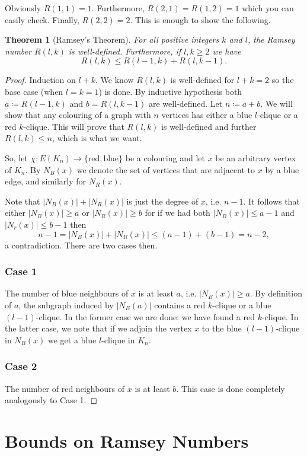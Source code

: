 \documentclass{report}
\theoremstyle{definition}
\theoremstyle{plain}
\newtheorem{thm}{Theorem}
\theoremstyle{definition}
\begin{document}
	Obviously $R(1,1) = 1$. Furthermore, $R(2,1) = R(1,2) = 1$ which you can easily check. Finally, $R(2,2)= 2$. This is enough to show the following.
	\begin{thm}[Ramsey's Theorem]\label{thm:ramsey}
		For all positive integers $k$ and $l$, the Ramsey number $R(l,k)$ is well-defined. Furthermore, if $l,k\geq 2$ we have
		\[
			R(l,k) \leq R(l-1,k) + R(l,k-1).
		\] 
	\end{thm} 
	\begin{proof}
		Induction on $l+k$. We know $R(l,k)$ is well-defined for $l+k = 2$ so the base case (when $l=k=1$) is done. By inductive hypothesis both $a\coloneqq R(l-1, k)$ and $b = R(l,k-1)$ are well-defined. Let $n\coloneqq a+b$. We will show that any colouring of a graph with $n$ vertices has either a blue $l$-clique or a red $k$-clique. This will prove that $R(l,k)$ is well-defined and further $R(l,k) \leq n$, which is what we want.
		
		So, let $\chi \colon E(K_n) \to \{\text{red},\text{blue}\}$ be a colouring and let $x$ be an arbitrary vertex of $K_n$. By $N_B(x)$ we denote the set of vertices that are adjacent to $x$ by a blue edge, and similarly for $N_R(x)$.
		
		Note that $|N_B(x)| + |N_R(x)|$ is just the degree of $x$, i.e. $n-1$. It follows that either $|N_B(x)| \geq a$ or $|N_R(x)|\geq b$ for if we had both $|N_B(x)| \leq a- 1$ and $|N_r(x)|\leq b-1$ then
		\[
			n-1 = |N_B(x)| + |N_R(x)| \leq (a - 1) + (b-1)  = n-2,
		\]
		a contradiction. There are two cases then.
		\subsubsection*{Case 1}
		The number of blue neighbours of $x$ is at least $a$, i.e. $|N_B(x)|\geq a$. By definition of $a$, the subgraph induced by $|N_B(a)|$ contains a red $k$-clique or a blue $(l-1)$-clique. In the former case we are done: we have found a red $k$-clique. In the latter case, we note that if we adjoin the vertex $x$ to the blue $(l-1)$-clique in $N_B(x)$ we get a blue $l$-clique in $K_n$.
		\subsubsection*{Case 2}
		The number of red neighbours of $x$ is at least $b$. This case is done completely analogously to Case 1.
	\end{proof}
	\section{Bounds on Ramsey Numbers}
\end{document}
